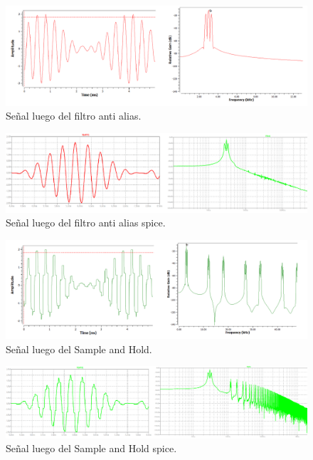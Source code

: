 \begin{figure}[H]
	\centering
	\includegraphics[width=1\textwidth]{ImagenesEjercicio7/alias.PNG}
\caption{Señal luego del filtro anti alias.}
	\label{fig:alias}
\end{figure}


\begin{figure}[H]
	\centering
	\includegraphics[width=1\textwidth]{ImagenesEjercicio7/salias.PNG}
\caption{Señal luego del filtro anti alias spice.}
	\label{fig:salias}
\end{figure}

\begin{figure}[H]
	\centering
	\includegraphics[width=1\textwidth]{ImagenesEjercicio7/sh.PNG}
\caption{Señal luego del Sample and Hold.}
	\label{fig:sh}
\end{figure}

\begin{figure}[H]
	\centering
	\includegraphics[width=1\textwidth]{ImagenesEjercicio7/ssh.PNG}
\caption{Señal luego del Sample and Hold spice.}
	\label{fig:ssh}
\end{figure}

